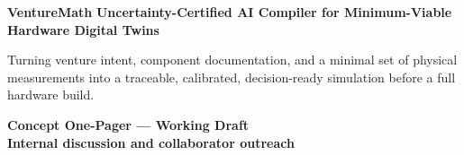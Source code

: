 \documentclass[a4paper,landscape]{article}
\begin{document}
\fontsize{7.15}{8.1}\selectfont

\begin{minipage}[t]{0.72\textwidth}
{\fontsize{18}{19.5}\selectfont\bfseries\color{VMDark}VentureMath}\hspace{1.6mm}
{\fontsize{10.4}{11.4}\selectfont\bfseries\color{VMTeal}Uncertainty-Certified AI Compiler for Minimum-Viable Hardware Digital Twins}

{\fontsize{8.0}{8.9}\selectfont\color{black!78}
Turning venture intent, component documentation, and a minimal set of physical measurements into a traceable, calibrated, decision-ready simulation before a full hardware build.}
\end{minipage}
\hfill
\begin{minipage}[t]{0.255\textwidth}
\raggedleft
\colorbox{VMLight}{\parbox{0.95\linewidth}{\centering\bfseries\color{VMDark}Concept One-Pager --- Working Draft\\[-1pt]\normalfont\fontsize{6.7}{7.4}\selectfont Internal discussion and collaborator outreach}}
\end{minipage}

\vspace{1.7mm}
\end{document}
